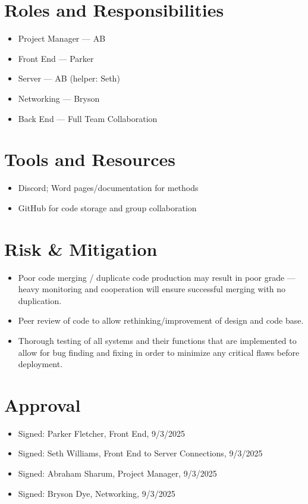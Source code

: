 \documentclass[10pt,titlepage]{article}
\begin{document}
    
    
	\section*{Roles and Responsibilities}
	\begin{itemize}
		\item Project Manager --- AB
		\item Front End --- Parker
		\item Server --- AB (helper: Seth)
		\item Networking --- Bryson
		\item Back End --- Full Team Collaboration
	\end{itemize}
	
	\section*{Tools and Resources}
	\begin{itemize}
		\item Discord; Word pages/documentation for methods
		\item GitHub for code storage and group collaboration
	\end{itemize}
	
	\section*{Risk \& Mitigation}
	\begin{itemize}
		\item Poor code merging / duplicate code production may result in poor grade --- heavy monitoring and cooperation will ensure successful merging with no duplication.
		\item Peer review of code to allow rethinking/improvement of design and code base.
        \item Thorough testing of all systems and their functions that are implemented to allow for bug finding and fixing in order to minimize any critical flaws before deployment.
	\end{itemize}
	
	\section*{Approval}
	\begin{itemize}
		\item Signed: Parker Fletcher, Front End, 9/3/2025
		\item Signed: Seth Williams, Front End to Server Connections, 9/3/2025
		\item Signed: Abraham Sharum, Project Manager, 9/3/2025
		\item Signed: Bryson Dye, Networking, 9/3/2025
	\end{itemize}
	
\end{document}
